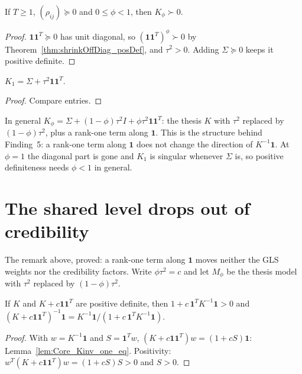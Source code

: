 \begin{theorem}\label{thm:Kphi_posDef}
  \leanok
  If $T \ge 1$, $(\rho_{ij}) \succeq 0$ and $0 \le \phi < 1$, then
  $K_\phi \succ 0$.
\end{theorem}
\begin{proof}
  \leanok
  $\mathbf 1\mathbf 1^T \succeq 0$ has unit diagonal, so
  $(\mathbf 1\mathbf 1^T)^\phi \succ 0$ by Theorem~\ref{thm:shrinkOffDiag_posDef},
  and $\tau^2 > 0$. Adding $\Sigma \succeq 0$ keeps it positive definite.
\end{proof}

\begin{lemma}\label{lem:Kphi_one}
  \leanok
  $K_1 = \Sigma + \tau^2\mathbf 1\mathbf 1^T$.
\end{lemma}
\begin{proof}
  \leanok
  Compare entries.
\end{proof}

\begin{remark}\label{rem:Kphi_rankOne}
  In general $K_\phi = \Sigma + (1-\phi)\tau^2 I + \phi\tau^2\mathbf 1\mathbf 1^T$:
  the thesis $K$ with $\tau^2$ replaced by $(1-\phi)\tau^2$, plus a rank-one
  term along $\mathbf 1$. This is the structure behind Finding~5: a rank-one
  term along $\mathbf 1$ does not change the direction of $K^{-1}\mathbf 1$.
  At $\phi = 1$ the diagonal part is gone and $K_1$ is singular whenever
  $\Sigma$ is, so positive definiteness needs $\phi < 1$ in general.
\end{remark}

\section{The shared level drops out of credibility}\label{sec:hier_bridge2}

The remark above, proved: a rank-one term along $\mathbf 1$ moves neither the
GLS weights nor the credibility factors. Write $\phi\tau^2 = c$ and let
$M_\phi$ be the thesis model with $\tau^2$ replaced by $(1-\phi)\tau^2$.

\begin{lemma}\label{lem:Kinv_one_add_rankOne}
  \leanok
  If $K$ and $K + c\mathbf 1\mathbf 1^T$ are positive definite, then
  $1 + c\,\mathbf 1^TK^{-1}\mathbf 1 > 0$ and
  $(K + c\mathbf 1\mathbf 1^T)^{-1}\mathbf 1
    = K^{-1}\mathbf 1 / (1 + c\,\mathbf 1^TK^{-1}\mathbf 1)$.
\end{lemma}
\begin{proof}
  \leanok
  With $w = K^{-1}\mathbf 1$ and $S = \mathbf 1^Tw$,
  $(K + c\mathbf 1\mathbf 1^T)w = (1 + cS)\mathbf 1$: Lemma~\ref{lem:Core_Kinv_one_eq}. Positivity:
  $w^T(K + c\mathbf 1\mathbf 1^T)w = (1+cS)S > 0$ and $S > 0$.
\end{proof}

